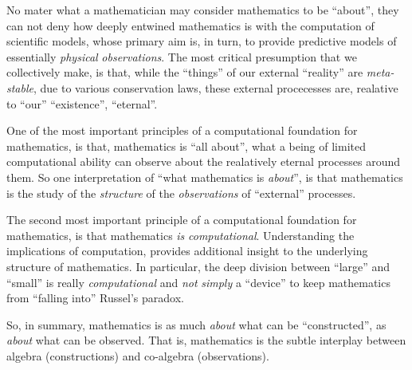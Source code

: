 No mater what a mathematician may consider mathematics to be ``about'', they can
not deny how deeply entwined mathematics is with the computation of scientific
models, whose primary aim is, in turn, to provide predictive models of
essentially \emph{physical} \emph{observations}. The most critical presumption
that we collectively make, is that, while the ``things'' of our external
``reality'' are \emph{meta-stable}, due to various conservation laws, these
external procecesses are, realative to ``our'' ``existence'', ``eternal''.

One of the most important principles of a computational foundation for
mathematics, is that, mathematics is ``all about'', what a being of limited
computational ability can observe about the realatively eternal processes around
them. So one interpretation of ``what mathematics is \emph{about}'', is that
mathematics is the study of the \emph{structure} of the \emph{observations} of
``external'' processes.

The second most important principle of a computational foundation for
mathematics, is that mathematics \emph{is} \emph{computational}. Understanding
the implications of computation, provides additional insight to the underlying
structure of mathematics. In particular, the deep division between ``large'' and
``small'' is really \emph{computational} and \emph{not} \emph{simply} a
``device'' to keep mathematics from ``falling into'' Russel's paradox.

So, in summary, mathematics is as much \emph{about} what can be ``constructed'',
as \emph{about} what can be observed. That is, mathematics is the subtle
interplay between algebra (constructions) and co-algebra (observations).

